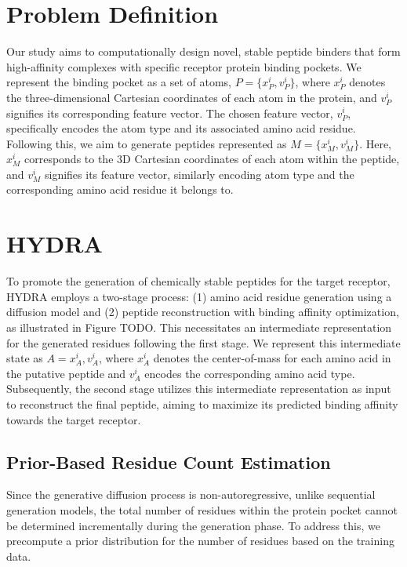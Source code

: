 \section{Problem Definition} 
Our study aims to computationally design novel, stable peptide binders that form high-affinity complexes with specific receptor protein binding pockets.
We represent the binding pocket as a set of atoms, $P = \{x_P^i, v_P^i\}$, where $x_P^i$ denotes the three-dimensional Cartesian coordinates of each atom in the protein, and $v_P^i$ signifies its corresponding feature vector. The chosen feature vector, $v_P^i$, specifically encodes the atom type and its associated amino acid residue. Following this, we aim to generate peptides represented as $M = \{x_M^i, v_M^i\}$. Here, $x_M^i$ corresponds to the 3D Cartesian coordinates of each atom within the peptide, and $v_M^i$ signifies its feature vector, similarly encoding atom type and the corresponding amino acid residue it belongs to.

\section{HYDRA}
To promote the generation of chemically stable peptides for the target receptor, HYDRA employs a two-stage process: (1) amino acid residue generation using a diffusion model and (2) peptide reconstruction with binding affinity optimization, as illustrated in Figure TODO. This necessitates an intermediate representation for the generated residues following the first stage. We represent this intermediate state as $A = {x_A^i, v_A^i}$, where $x_A^i$ denotes the center-of-mass for each amino acid in the putative peptide and $v_A^i$ encodes the corresponding amino acid type. Subsequently, the second stage utilizes this intermediate representation as input to reconstruct the final peptide, aiming to maximize its predicted binding affinity towards the target receptor.

\subsection{Prior-Based Residue Count Estimation}
Since the generative diffusion process is non-autoregressive, unlike sequential generation models, the total number of residues within the protein pocket cannot be determined incrementally during the generation phase. To address this, we precompute a prior distribution for the number of residues based on the training data. \\

